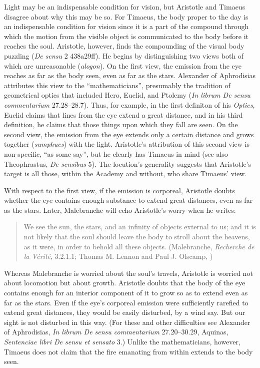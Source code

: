 Light may be an indispensable condition for vision, but Aristotle and Timaeus disagree about why this may be so. For Timaeus, the body proper to the day is an indispensable condition for vision since it is a part of the compound through which the motion from the visible object is communicated to the body before it reaches the soul. Aristotle, however, finds the compounding of the visual body puzzling (\emph{De sensu} 2 438a29ff). He begins by distinguishing two views both of which are unreasonable (\emph{alogon}). On the first view, the emission from the eye reaches as far as the body seen, even as far as the stars. Alexander of Aphrodisias attributes this view to the ``mathematicians'', presumably the tradition of geometrical optics that included Hero, Euclid, and Ptolemy (\emph{In librum De sensu commentarium} 27.28--28.7). Thus, for example, in the first definiton of his \emph{Optics}, Euclid claims that lines from the eye extend a great distance, and in his third definition, he claims that those things upon which they fall are seen. On the second view, the emission from the eye extends only a certain distance and grows together (\emph{sumphues}) with the light. Aristotle's attribution of this second view is non-specific, ``as some say'', but he clearly has Timaeus in mind (see also Theophrastus, \emph{De sensibus} 5). The locution's generality suggests that Aristotle's target is all those, within the Academy and without, who share Timaeus' view.

With respect to the first view, if the emission is corporeal, Aristotle doubts whether the eye contains enough substance to extend great distances, even as far as the stars. Later, Malebranche will echo Aristotle's worry when he writes:
\begin{quote}
	We see the sun, the stars, and an infinity of objects external to us; and it is not likely that the soul should leave the body to stroll about the heavens, as it were, in order to behold all these objects. (Malebranche, \emph{Recherche de la V\'{e}rit\'{e}}, 3.2.1.1; Thomas M. Lennon and Paul J. Olscamp, \citeyear[217]{Malebranche:1997sf})
\end{quote}
Whereas Malebranche is worried about the soul's travels, Aristotle is worried not about locomotion but about growth. Aristotle doubts that the body of the eye contains enough for an interior component of it to grow so as to extend even as far as the stars. Even if the eye's corporeal emission were sufficiently rarefied to extend great distances, they would be easily disturbed, by a wind say. But our sight is not disturbed in this way.  (For these and other difficulties see Alexander of Aphrodisias, \emph{In librum De sensu commentarium} 27.20--30.29, Aquinas, \emph{Sentenciae libri De sensu et sensato} 3.) Unlike the mathematicians, however, Timaeus does not claim that the fire emanating from within extends to the body seen.

